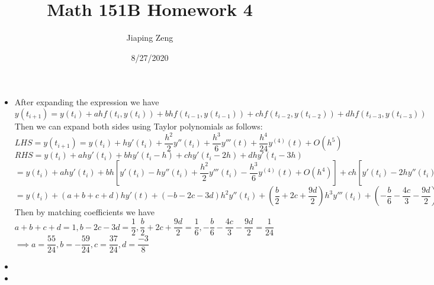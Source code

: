 \documentclass{article}
\title{Math 151B Homework 4}
\date{8/27/2020}
\author{Jiaping Zeng}
\begin{document}
\maketitle

\begin{itemize}
    \item [Q1] After expanding the expression we have\\$y(t_{i+1})=y(t_i)+ahf(t_i,y(t_i))+bhf(t_{i-1},y(t_{i-1}))+chf(t_{i-2},y(t_{i-2}))+dhf(t_{i-3},y(t_{i-3}))$\\Then we can expand both sides using Taylor polynomials as follows:\\$LHS=y(t_{i+1})=y(t_i)+hy'(t_i)+\dfrac{h^2}{2}y''(t_i)+\dfrac{h^3}{6}y'''(t)+\dfrac{h^4}{24}y^{(4)}(t)+O(h^5)$\\
    $RHS=y(t_i)+ahy'(t_i)+bhy'(t_i-h)+chy'(t_i-2h)+dhy'(t_i-3h)$\\
    $=y(t_i)+ahy'(t_i)+bh[y'(t_i)-hy''(t_i)+\dfrac{h^2}{2}y'''(t_i)-\dfrac{h^3}{6}y^{(4)}(t)+O(h^4)]+ch[y'(t_i)-2hy''(t_i)+2h^2y'''(t_i)-\dfrac{4h^3}{3}y^{(4)}(t)+O(h^4)]+dh[y'(t_i)-3hy''(t_i)+\dfrac{9h^2}{2}y'''(t_i)-\dfrac{9h^3}{2}y^{(4)}(t)+O(h^4)]$\\
    $=y(t_i)+(a+b+c+d)hy'(t)+(-b-2c-3d)h^2y''(t_i)+(\dfrac{b}{2}+2c+\dfrac{9d}{2})h^3y'''(t_i)+(-\dfrac{b}{6}-\dfrac{4c}{3}-\dfrac{9d}{2})h^4y^{(4)}(t_i)+O(h^5)$\\
    Then by matching coefficients we have\\$a+b+c+d=1,b-2c-3d=\dfrac{1}{2},\dfrac{b}{2}+2c+\dfrac{9d}{2}=\dfrac{1}{6},-\dfrac{b}{6}-\dfrac{4c}{3}-\dfrac{9d}{2}=\dfrac{1}{24}$\\$\implies\boxed{a=\dfrac{55}{24},b=-\dfrac{59}{24},c=\dfrac{37}{24},d=\dfrac{-3}{8}}$
    \item [Q2] 
    \item [Q3] 
\end{itemize}
\end{document}
